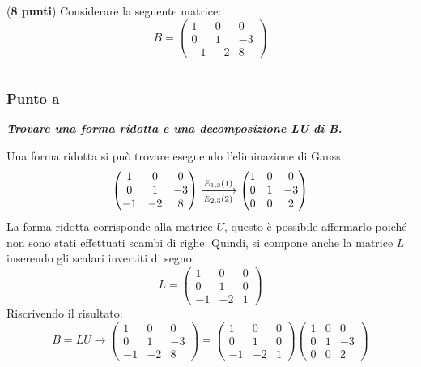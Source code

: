 \documentclass[a4paper]{article}
\newcommand{\longline}{\noindent\rule{\textwidth}{0.4pt}}
\begin{document}
	(\textbf{8 punti}) Considerare la seguente matrice:
	\begin{equation*}
		B = \begin{pmatrix}
			1 & 0 & 0 \\
			0 & 1 & -3 \\
			-1 & -2 & 8
		\end{pmatrix}
	\end{equation*}

	\longline

	\subsubsection{Punto a}

	\textcolor{Green4}{\textbf{\emph{Trovare una forma ridotta e una decomposizione LU di B.}}}\newline

	\noindent
	Una forma ridotta si può trovare eseguendo l'eliminazione di Gauss:
	\begin{equation*}
		\begin{pmatrix}
			1 & 0 & 0 \\
			0 & 1 & -3 \\
			-1 & -2 & 8
		\end{pmatrix}
		\xlongrightarrow[E_{2,3}\left(2\right)]{E_{1,3}\left(1\right)}
		\begin{pmatrix}
			1 & 0 & 0 \\
			0 & 1 & -3 \\
			0 & 0 & 2
		\end{pmatrix}
	\end{equation*}
	La forma ridotta corrisponde alla matrice $U$, questo è possibile affermarlo poiché non sono stati effettuati scambi di righe. Quindi, si compone anche la matrice $L$ inserendo gli scalari invertiti di segno:
	\begin{equation*}
		L = \begin{pmatrix}
			1 & 0 & 0 \\
			0 & 1 & 0 \\
			-1 & -2 & 1
		\end{pmatrix}
	\end{equation*}
	Riscrivendo il risultato:
	\begin{equation*}
		B = LU \rightarrow \begin{pmatrix}
			1 & 0 & 0 \\
			0 & 1 & -3 \\
			-1 & -2 & 8
		\end{pmatrix} = \begin{pmatrix}
			1 & 0 & 0 \\
			0 & 1 & 0 \\
			-1 & -2 & 1
		\end{pmatrix} \begin{pmatrix}
			1 & 0 & 0 \\
			0 & 1 & -3 \\
			0 & 0 & 2
		\end{pmatrix}
	\end{equation*}\newpage
\end{document}

